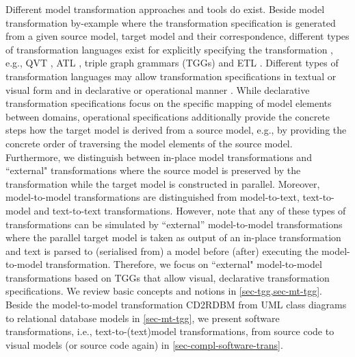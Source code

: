 Different model transformation approaches and tools \cite{HLG13+,Rose2014} do exist.
Beside model transformation by-example \cite{Kappel2012} where the transformation specification is generated from a given source model, target model and their correspondence, different types of transformation languages exist for explicitly specifying the transformation \cite{Guerra2013}, e.g., QVT \cite{QVT}, ATL \cite{Jouault200831}, triple graph grammars (TGGs) \cite{DBLP:journals/eceasst/AnjorinLS15} and ETL \cite{Kolovos2008}.
Different types of transformation languages may allow transformation specifications in textual or visual form and in declarative or operational manner \cite{tm13}.
While declarative transformation specifications focus on the specific mapping of model elements between domains, operational specifications additionally provide the concrete steps how the target model is derived from a source model, e.g., by providing the concrete order of traversing the model elements of the source model.
Furthermore, we distinguish between in-place model transformations and ``external" transformations where the source model is preserved by the transformation while the target model is constructed in parallel.
Moreover, model-to-model transformations are distinguished from model-to-text, text-to-model and text-to-text transformations.
However, note that any of these types of transformations can be simulated by ``external'' model-to-model transformations where the parallel target model is taken as output of an in-place transformation and text is parsed to (serialised from) a model before (after) executing the model-to-model transformation.
Therefore, we focus on ``external" model-to-model transformations based on TGGs that allow visual, declarative transformation specifications.
We review basic concepts and notions in \cref{sec-tgg,sec-mt-tgg}.
Beside the model-to-model transformation CD2RDBM from UML class diagrams to relational database models in \ref{sec-mt-tgg}, we present software transformations, i.e., text-to-(text)model transformations, from source code to visual models (or source code again) in \cref{sec-compl-software-trans}.

